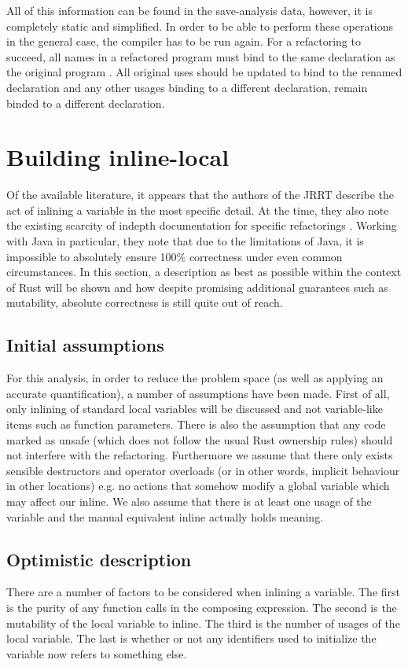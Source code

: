All of this information can be found in the save-analysis data, however, it is completely static and simplified. In order to be able to perform these operations in the general case, the compiler has to be run again. For a refactoring to succeed, all names in a refactored program must bind to the same declaration as the original program \cite{schafer2010specification}. All original uses should be updated to bind to the renamed declaration and any other usages binding to a different declaration, remain binded to a different declaration.

\section{Building inline-local}\label{S:buildIL}
Of the available literature, it appears that the authors of the JRRT describe the act of inlining a variable in the most specific detail. At the time, they also note the existing scarcity of indepth documentation for specific refactorings \cite{schafer2010specification}. Working with Java in particular, they note that due to the limitations of Java, it is impossible to absolutely ensure 100\% correctness under even common circumstances. In this section, a description as best as possible within the context of Rust will be shown and how despite promising additional guarantees such as mutability, absolute correctness is still quite out of reach.

\subsection{Initial assumptions}
For this analysis, in order to reduce the problem space (as well as applying an accurate quantification), a number of assumptions have been made. First of all, only inlining of standard local variables will be discussed and not variable-like items such as function parameters. There is also the assumption that any code marked as unsafe (which does not follow the usual Rust ownership rules) should not interfere with the refactoring. Furthermore we assume that there only exists sensible destructors and operator overloads (or in other words, implicit behaviour in other locations) e.g. no actions that somehow modify a global variable which may affect our inline. We also assume that there is at least one usage of the variable and the manual equivalent inline actually holds meaning.

\subsection{Optimistic description}
There are a number of factors to be considered when inlining a variable. The first is the purity of any function calls in the composing expression. The second is the mutability of the local variable to inline. The third is the number of usages of the local variable. The last is whether or not any identifiers used to initialize the variable now refers to something else.

